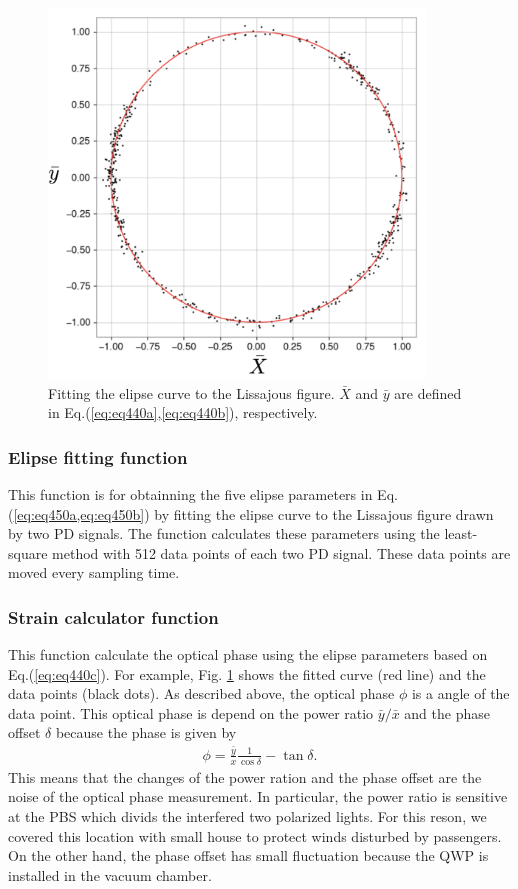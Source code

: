 \begin{figure}[h]
  \centering
  \includegraphics[width=10cm]{./img_chap4/img440.png}
  \caption{Fitting the elipse curve to the Lissajous figure. $\bar{X}$ and $\bar{y}$ are defined in Eq.(\ref{eq:eq440a},\ref{eq:eq440b}), respectively. } \label{img:img440}
\end{figure}

\subsubsection{Elipse fitting function}
This function is for obtainning the five elipse parameters in Eq.(\ref{eq:eq450a,eq:eq450b}) by fitting the elipse curve to the Lissajous figure drawn by two PD signals. The function calculates these parameters using the least-square method with 512 data points of each two PD signal. These data points are moved every sampling time.

\subsubsection{Strain calculator function}
This function calculate the optical phase using the elipse parameters based on Eq.(\ref{eq:eq440c}). For example, Fig. \ref{img:img440} shows the fitted curve (red line) and the data points (black dots). As described above, the optical phase $\phi$ is a angle of the data point. This optical phase is depend on the power ratio $\bar{y}/\bar{x}$ and the phase offset $\delta$ because the phase is given by
\begin{eqnarray}
  \phi = \frac{\bar{y}}{x}\frac{1}{\cos{\delta}} - \tan{\delta}.
\end{eqnarray}
This means that the changes of the power ration and the phase offset are the noise of the optical phase measurement. In particular, the power ratio is sensitive at the PBS which divids the interfered two polarized lights. For this reson,  we covered this location with small house to protect winds disturbed by passengers. On the other hand, the phase offset has small fluctuation because the QWP is installed in the vacuum chamber.

